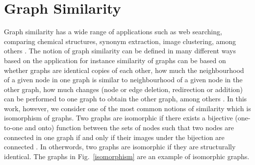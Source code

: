 \documentclass[10pt,a4paper]{article}
\begin{document}
     \section{Graph Similarity}
     Graph similarity has a wide range of applications such as web searching, comparing chemical structures, synonym extraction, image clustering, among others \citep{zager2008graph, nikolic2012measuring}. 
     The notion of graph similarity can be defined in many different ways based on the application for instance similarity of graphs can be based on whether graphs are identical copies of each other, how much the neighbourhood of a given node in one graph is similar to neighbourhood of a given node in the other graph, how much changes (node or edge deletion, redirection or addition) can be performed to one graph to obtain the other graph, among others \cite{zager2008graph}. In this work, however, we consider one of the most common notions of similarity which is isomorphism of graphs.
     Two graphs are isomorphic if there exists a bijective (one-to-one and onto) function between the sets of nodes
     such that two nodes are connected in one graph if and only if their images under the bijection are connected \citep{zager2008graph}. In otherwords, two graphs are isomorphic if they are structurally identical. The graphs in Fig.~\ref{isomorphism} are an example of isomorphic graphs.
     
\end{document}
